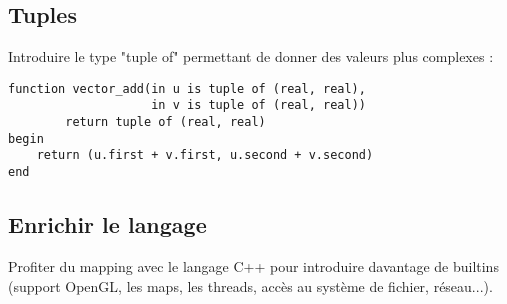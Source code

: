 \subsection{Tuples}
Introduire le type "tuple of" permettant de donner des valeurs plus complexes :

\begin{verbatim}
function vector_add(in u is tuple of (real, real),
                    in v is tuple of (real, real))
        return tuple of (real, real)
begin
    return (u.first + v.first, u.second + v.second)
end
\end{verbatim}

\subsection{Enrichir le langage}

Profiter du mapping avec le langage C++ pour introduire davantage de builtins
(support OpenGL, les maps, les threads, accès au système de fichier, réseau...).

